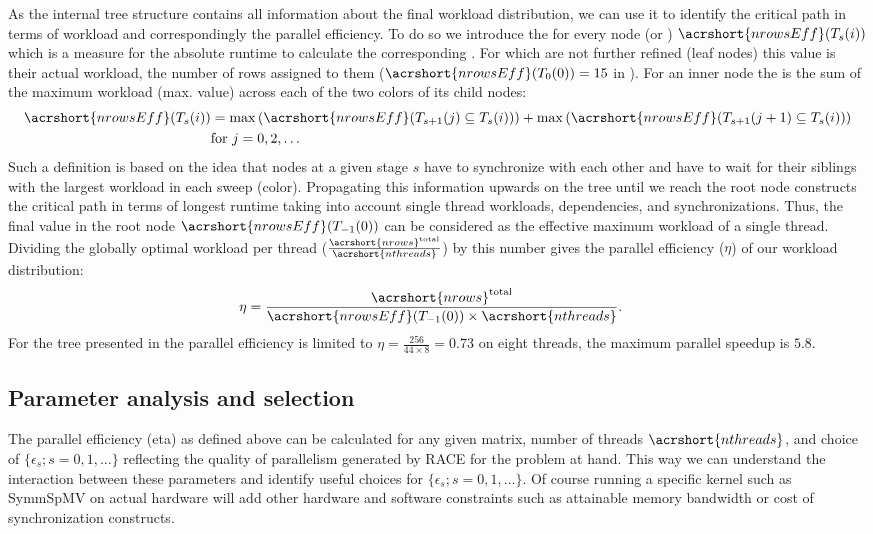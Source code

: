 As the internal tree structure contains all information about the final workload distribution, we can use it to identify the critical path in terms of workload and correspondingly the parallel efficiency. To do so we introduce the \effRow for every node (or \levelGroup) $\acrshort{nrowsEff}(T_s(i))$  which is a measure for the absolute runtime to calculate the corresponding \levelGroup. For \levelGroups which are not further refined (leaf nodes) this value is their actual workload, \ie the number of rows assigned to them ($\acrshort{nrowsEff}(T_0(0)) = 15$ in ). For an inner node the \effRow  is the sum of the maximum workload (\ie max. \effRow value) across each of the two colors of its child nodes:
\begin{align*}
\acrshort{nrowsEff}(T_s(i)) &= \max\left(\acrshort{nrowsEff}(T_{s+1}(j) \subseteq T_s(i))\right) + \max\left(\acrshort{nrowsEff}(T_{s+1}(j+1) \subseteq T_s(i))\right)\\
 & \text{for } j=0,2,\ldots
\end{align*}
Such a definition is based on the idea that nodes at a given stage $s$ have to synchronize with each other and have to wait for their siblings with the largest workload in each sweep (color). Propagating this information upwards on the tree until we reach the root node constructs the critical path in terms of longest runtime taking into account single thread workloads, dependencies, and synchronizations. Thus, the final value in the root node $\acrshort{nrowsEff}(T_{-1}(0))$ can be considered as the effective maximum workload of a single thread. Dividing the globally optimal workload per thread ($\frac{\acrshort{nrows}^\mathrm{total}}{\acrshort{nthreads}}$) by this number gives the parallel efficiency ($\eta$) of our workload distribution: 
\begin{align*}
	\eta &= \frac{ \acrshort{nrows}^\mathrm{total}} {\acrshort{nrowsEff}(T_{-1}(0)) \times \acrshort{nthreads}}. 
\end{align*}
For the tree presented in  the parallel efficiency is limited to $\eta=\frac{256}{44 \times 8 } = 0.73$ on eight threads, \ie the maximum parallel speedup is $5.8$.

\subsection{Parameter analysis and selection}
\label{subsec:param_analysis}
The parallel efficiency (\acrshort{eta}) as defined above can be calculated for any given matrix, number of threads $\acrshort{nthreads}$,  and choice of $\{\epsilon_s; s=0,1,\ldots\}$ reflecting the quality of  parallelism generated by \acrshort{RACE} for the problem at hand.  This way we can understand the interaction between these parameters and identify useful choices for $\{\epsilon_s; s=0,1,\ldots\}$. Of course running a specific kernel such as \acrshort{SymmSpMV} on actual hardware will add other hardware and software constraints such as attainable memory bandwidth or cost of synchronization constructs. 

